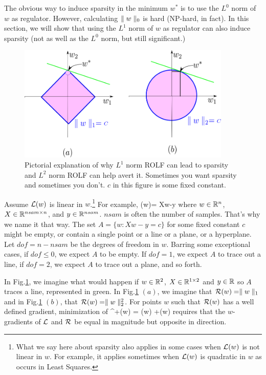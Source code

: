 The obvious way to induce sparsity in 
the minimum $w^*$ is to use the $L^0$ norm of $w$ as regulator.
However, calculating $\parallel w\parallel_0$ is
hard (NP-hard, in fact). In this section, we will
show that using the $L^1$ norm
of $w$ as regulator can also induce sparsity (not as well as the
$L^0$ norm, but still significant.)
\begin{figure}[h!]
\centering
\includegraphics[width=4in]
{regularization/sparsity.png}
\caption{Pictorial explanation of
why $L^1$ norm ROLF can lead to sparsity
and $L^2$ norm ROLF can help avert it. Sometimes
you want sparsity and sometimes you don't. $c$ in this figure is some 
fixed constant.
}
\label{fig-sparsity}
\end{figure}

Assume ${\cal L}(w)$ is linear in $w$.\footnote{What we say here about sparsity also applies in some cases when ${\cal L}(w)$ is not linear in $w$. For example, it applies sometimes when ${\cal L}(w)$
is quadratic in $w$ as occurs in Least Squares.}
For example, 
\beq
\call(w)= Xw-y
\eeq
where $w\in{ \mathbb{R}}^n$, $X\in { \mathbb{R}}^{nsam\times n}$,  and $y\in{ \mathbb{R}}^{nsam}$.
$nsam$ is often the number of samples. That's why we name it that way.
The set $A=\{w: Xw-y=c\}$ for some fixed constant $c$  might be empty,
or contain a single point or a line or a plane, or a hyperplane. Let $dof=n-nsam$
be the degrees  of freedom in $w$.
Barring some exceptional cases, if $dof\leq 0$, we expect $A$ to be empty.
If $dof=1$, we expect $A$ to trace out a line, if $dof= 2$, we expect $A$ to
trace out a plane, and so forth.

In Fig.\ref{fig-sparsity}, we imagine
what would happen if
$w\in { \mathbb{R}}^2$, $X\in { \mathbb{R}}^{1\times 2}$
and $y\in { \mathbb{R}}$ so $A$ traces a line,
represented in green.
In Fig.\ref{fig-sparsity} $(a)$,
we imagine that ${\cal R}(w)=\parallel w\parallel_1$
and in Fig.\ref{fig-sparsity} $(b)$, that
${\cal R}(w)=\parallel w\parallel_2^2$.
For points $w$ such that ${\cal R}(w)$
has a well defined gradient, 
minimization of 
\beq
\call^+(w) = \call(w) +\calr(w)
\eeq
requires that the $w$-gradients of
${\cal L}$ and ${\cal R}$ be equal in magnitude but opposite in direction.

